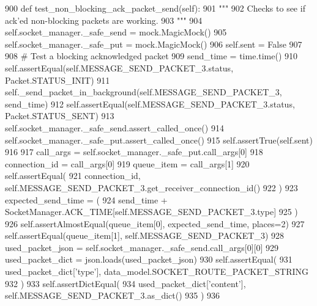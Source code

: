 \begin{DoxyCode}
900     \textcolor{keyword}{def }test\_non\_blocking\_ack\_packet\_send(self):
901         \textcolor{stringliteral}{"""}
902 \textcolor{stringliteral}{        Checks to see if ack'ed non-blocking packets are working.}
903 \textcolor{stringliteral}{        """}
904         self.socket\_manager.\_safe\_send = mock.MagicMock()
905         self.socket\_manager.\_safe\_put = mock.MagicMock()
906         self.sent = \textcolor{keyword}{False}
907 
908         \textcolor{comment}{# Test a blocking acknowledged packet}
909         send\_time = time.time()
910         self.assertEqual(self.MESSAGE\_SEND\_PACKET\_3.status, Packet.STATUS\_INIT)
911         self.\_send\_packet\_in\_background(self.MESSAGE\_SEND\_PACKET\_3, send\_time)
912         self.assertEqual(self.MESSAGE\_SEND\_PACKET\_3.status, Packet.STATUS\_SENT)
913         self.socket\_manager.\_safe\_send.assert\_called\_once()
914         self.socket\_manager.\_safe\_put.assert\_called\_once()
915         self.assertTrue(self.sent)
916 
917         call\_args = self.socket\_manager.\_safe\_put.call\_args[0]
918         connection\_id = call\_args[0]
919         queue\_item = call\_args[1]
920         self.assertEqual(
921             connection\_id, self.MESSAGE\_SEND\_PACKET\_3.get\_receiver\_connection\_id()
922         )
923         expected\_send\_time = (
924             send\_time + SocketManager.ACK\_TIME[self.MESSAGE\_SEND\_PACKET\_3.type]
925         )
926         self.assertAlmostEqual(queue\_item[0], expected\_send\_time, places=2)
927         self.assertEqual(queue\_item[1], self.MESSAGE\_SEND\_PACKET\_3)
928         used\_packet\_json = self.socket\_manager.\_safe\_send.call\_args[0][0]
929         used\_packet\_dict = json.loads(used\_packet\_json)
930         self.assertEqual(
931             used\_packet\_dict[\textcolor{stringliteral}{'type'}], data\_model.SOCKET\_ROUTE\_PACKET\_STRING
932         )
933         self.assertDictEqual(
934             used\_packet\_dict[\textcolor{stringliteral}{'content'}], self.MESSAGE\_SEND\_PACKET\_3.as\_dict()
935         )
936 
\end{DoxyCode}
\mbox{\label{classparlai_1_1mturk_1_1core_1_1legacy__2018_1_1test_1_1test__socket__manager_1_1TestSocketManagerRoutingFunctionality_a0faf9ae9ec013cacaff32f873ed2d597}} 
